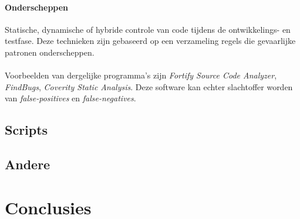 \documentclass[../main.tex]{subfiles}
\begin{document}
\paragraph{Onderscheppen} Statische, dynamische of hybride controle van code tijdens de ontwikkelings- en testfase. Deze technieken zijn gebaseerd op een verzameling regels die gevaarlijke patronen onderscheppen.
\\\\
Voorbeelden van dergelijke programma's zijn \textit{Fortify Source Code Analyzer}, \textit{FindBugs}, \textit{Coverity Static Analysis}. Deze software kan echter slachtoffer worden van \textit{false-positives} en \textit{false-negatives}.

\subsection{Scripts}
\subsection{Andere}

\section{Conclusies}
\end{document}
